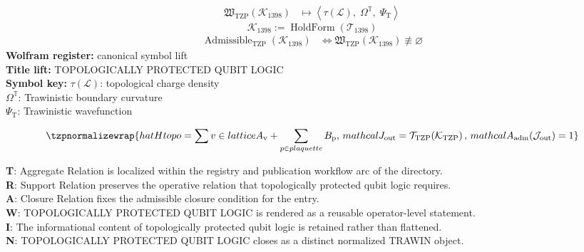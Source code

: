 \noindent
\begin{minipage}[t]{0.48\linewidth}
\begingroup
\small
\[
\begin{aligned}
\mathfrak{W}_{\mathrm{TZP}}\!\left(\mathcal{K}_{1398}\right)
&\longmapsto
\left\langle \tau(\mathcal{L}),\; \Omega^{\mathbb{T}},\; \Psi_{\mathrm{T}} \right\rangle
\end{aligned}
\]
\[
\mathcal{K}_{1398}
:=
\operatorname{HoldForm}\!\left(\mathcal{T}_{1398}\right)
\]
\[
\begin{aligned}
\operatorname{Admissible}_{\mathrm{TZP}}\!\left(\mathcal{K}_{1398}\right)
&\Longleftrightarrow
\mathfrak{W}_{\mathrm{TZP}}\!\left(\mathcal{K}_{1398}\right)\not\equiv\varnothing
\end{aligned}
\]
\textbf{Wolfram register:} canonical symbol lift\\
\textbf{Title lift:} TOPOLOGICALLY PROTECTED QUBIT LOGIC\\
\textbf{Symbol key:} \(\tau(\mathcal{L})\): topological charge density\\ \(\Omega^{\mathbb{T}}\): Trawinistic boundary curvature\\ \(\Psi_{\mathrm{T}}\): Trawinistic wavefunction
\par
\endgroup
\end{minipage}\hfill
\begin{minipage}[t]{0.48\linewidth}
\[
\tzpnormalizewrap{hat{H} {topo} = \sum {v \in lattice} A_{\mathrm{v}} + \sum_{p \in plaquette} B_{\mathrm{p}},\,mathcal{J}_{\mathrm{out}} = \mathcal{T}_{\mathrm{TZP}}\!\left(\mathcal{K}_{\mathrm{TZP}}\right),\,mathcal{A}_{\mathrm{adm}}\!\left(\mathcal{J}_{\mathrm{out}}\right)=1}
\]

\small
\textbf{T}: Aggregate Relation is localized within the registry and publication workflow arc of the directory.\\
\textbf{R}: Support Relation preserves the operative relation that topologically protected qubit logic requires.\\
\textbf{A}: Closure Relation fixes the admissible closure condition for the entry.\\
\textbf{W}: TOPOLOGICALLY PROTECTED QUBIT LOGIC is rendered as a reusable operator-level statement.\\
\textbf{I}: The informational content of topologically protected qubit logic is retained rather than flattened.\\
\textbf{N}: TOPOLOGICALLY PROTECTED QUBIT LOGIC closes as a distinct normalized TRAWIN object.
\normalsize
\end{minipage}

